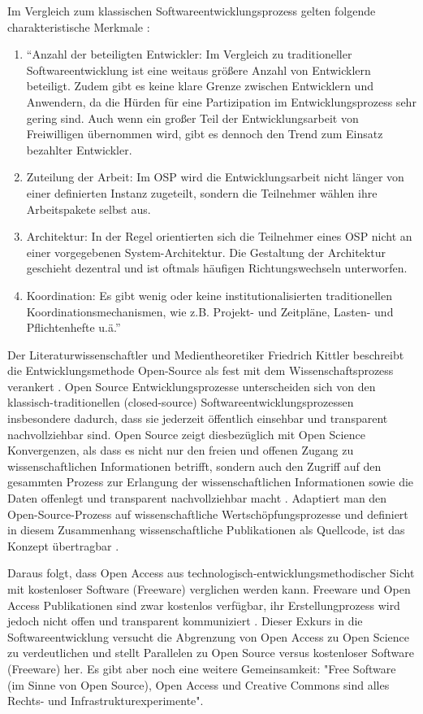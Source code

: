 Im Vergleich zum klassischen Softwareentwicklungsprozess gelten folgende charakteristische Merkmale \cite{suchen}:
\begin{enumerate}
\item “Anzahl der beteiligten Entwickler: Im Vergleich zu traditioneller Softwareentwicklung ist eine weitaus größere Anzahl von Entwicklern beteiligt. Zudem gibt es keine klare Grenze zwischen Entwicklern und Anwendern, da die Hürden für eine Partizipation im Entwicklungsprozess sehr gering sind. Auch wenn ein großer Teil der Entwicklungsarbeit von Freiwilligen übernommen wird, gibt es dennoch den Trend zum Einsatz bezahlter Entwickler.
\item Zuteilung der Arbeit: Im OSP wird die Entwicklungsarbeit nicht länger von einer definierten Instanz zugeteilt, sondern die Teilnehmer wählen ihre Arbeitspakete selbst aus.
\item Architektur: In der Regel orientierten sich die Teilnehmer eines OSP nicht an einer vorgegebenen System-Architektur. Die Gestaltung der Architektur geschieht dezentral und ist oftmals häufigen Richtungswechseln unterworfen.
\item Koordination: Es gibt wenig oder keine institutionalisierten traditionellen Koordinationsmechanismen, wie z.B. Projekt- und Zeitpläne, Lasten- und Pflichtenhefte u.ä.” \cite{suchen}
\end{enumerate}

Der Literaturwissenschaftler und Medientheoretiker Friedrich Kittler beschreibt die Entwicklungsmethode Open-Source als fest mit dem Wissenschaftsprozess verankert \cite{suchen}. Open Source Entwicklungsprozesse unterscheiden sich von den klassisch-traditionellen (closed-source) Softwareentwicklungsprozessen insbesondere dadurch, dass sie jederzeit öffentlich einsehbar und transparent nachvollziehbar sind. Open Source zeigt diesbezüglich mit Open Science Konvergenzen, als dass es nicht nur den freien und offenen Zugang zu wissenschaftlichen Informationen betrifft, sondern auch den Zugriff auf den gesammten Prozess zur Erlangung der wissenschaftlichen Informationen sowie die Daten offenlegt und transparent nachvollziehbar macht \cite{kelty_2004}. Adaptiert man den Open-Source-Prozess auf wissenschaftliche Wertschöpfungsprozesse und definiert in diesem Zusammenhang wissenschaftliche Publikationen als Quellcode, ist das Konzept übertragbar \cite{Singh_2008} \cite{Bradley_2008} \cite{Bradley_2007}. 

Daraus folgt, dass Open Access aus technologisch-entwicklungsmethodischer Sicht mit kostenloser Software (Freeware) \cite{suchen} verglichen werden kann. Freeware und Open Access Publikationen sind zwar kostenlos verfügbar, ihr Erstellungprozess wird jedoch nicht offen und transparent kommuniziert \cite{suchen}. Dieser Exkurs in die Softwareentwicklung versucht die Abgrenzung von Open Access zu Open Science zu verdeutlichen und stellt Parallelen zu Open Source versus kostenloser Software (Freeware) her. Es gibt aber noch eine  weitere Gemeinsamkeit: "Free Software (im Sinne von Open Source), Open Access und Creative Commons sind alles Rechts- und Infrastrukturexperimente"\cite{kelty_2004}.

